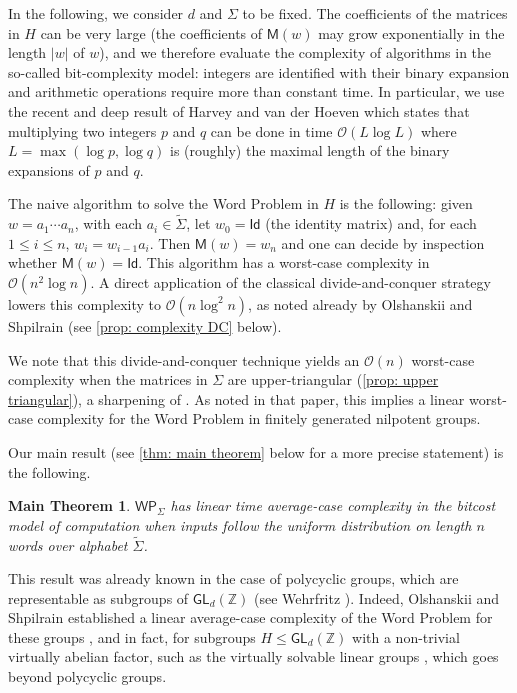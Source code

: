 \documentclass{article}
\def\alph{\tilde{\Sigma}}
\def\Id{\textsf{Id}}
\def\O{\mathcal{O}}
\def\Z{\mathbb{Z}}
\def\GL{\textsf{GL}}
\def\WP{\textsf{WP}}
\def\mat{\textsf{M}}
\theoremstyle{plain}
\newtheorem*{unnumberedthm}{Main Theorem}
\theoremstyle{definition}
\begin{document}
In the following, we consider $d$ and $\Sigma$ to be fixed. The coefficients of the matrices in $H$ can be very large (the coefficients of $\mat(w)$ may grow exponentially in the length $|w|$ of $w$), and we therefore evaluate the complexity of algorithms in the so-called bit-complexity model: integers are identified with their binary expansion and arithmetic operations require more than constant time.  In particular, we use the recent and deep result of Harvey and van der Hoeven \cite{harvey2021integer} which states that multiplying two integers $p$ and $q$ can be done in time $\O(L\log L)$ where $L = \max(\log p, \log q)$ is (roughly) the maximal length of the binary expansions of $p$ and $q$.

The naive algorithm to solve the Word Problem in $H$ is the following: given $w = a_1\cdots a_n$, with each $a_i \in \alph$, let $w_0 = \Id$ (the identity matrix) and, for each $1\le i\le n$, $w_i = w_{i-1}a_i$. Then $\mat(w) = w_n$ and one can decide by inspection whether $\mat(w) = \Id$. This algorithm has a worst-case complexity in $\O(n^2\log n)$. A direct application of the classical divide-and-conquer strategy lowers this complexity to $\O(n\log^2 n)$, as noted already by Olshanskii and Shpilrain \cite[Proposition 2]{2025:OlshShp} (see \cref{prop: complexity DC} below).

We note that this divide-and-conquer technique yields an $\O(n)$ worst-case complexity when the matrices in $\Sigma$ are upper-triangular (\cref{prop: upper triangular}), a sharpening of \cite[Theorem 2]{2025:OlshShp}. As noted in that paper, this implies a linear worst-case complexity for the Word Problem in finitely generated nilpotent groups.

Our main result (see \cref{thm: main theorem} below for a more precise statement) is the following.

\begin{unnumberedthm}
    $\WP_\Sigma$ has linear time average-case complexity in the bitcost model of computation when inputs follow the uniform distribution on length $n$ words over alphabet $\alph$.
\end{unnumberedthm}

This result was already known in the case of polycyclic groups, which are representable as subgroups of $\GL_d(\Z)$ (see Wehrfritz \cite{1980:Wehrfritz}). Indeed, Olshanskii and Shpilrain established a linear average-case complexity of the Word Problem for these groups \cite[Theorem 3]{2025:OlshShp}, and in fact, for subgroups $H \le \GL_d(\Z)$ with a non-trivial virtually abelian factor, such as the virtually solvable linear groups \cite[Remark 4]{2025:OlshShp}, which goes beyond polycyclic groups.
\end{document}
